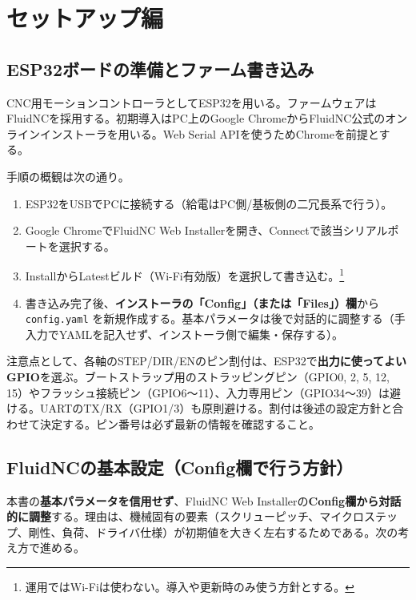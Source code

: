 \documentclass[uplatex,dvipdfmx]{ujarticle}
\begin{document}
\section{セットアップ編}

\subsection{ESP32ボードの準備とファーム書き込み}

CNC用モーションコントローラとしてESP32を用いる。ファームウェアはFluidNCを採用する。初期導入はPC上のGoogle ChromeからFluidNC公式のオンラインインストーラを用いる。Web Serial APIを使うためChromeを前提とする。

手順の概観は次の通り。
\begin{enumerate}
\item ESP32をUSBでPCに接続する（給電はPC側/基板側の二冗長系で行う）。
\item Google ChromeでFluidNC Web Installerを開き、Connectで該当シリアルポートを選択する。
\item InstallからLatestビルド（Wi-Fi有効版）を選択して書き込む。\footnote{運用ではWi-Fiは使わない。導入や更新時のみ使う方針とする。}
\item 書き込み完了後、\textbf{インストーラの「Config」（または「Files」）欄}から \texttt{config.yaml} を新規作成する。基本パラメータは後で対話的に調整する（手入力でYAMLを記入せず、インストーラ側で編集・保存する）。
\end{enumerate}

注意点として、各軸のSTEP/DIR/ENのピン割付は、ESP32で\textbf{出力に使ってよいGPIO}を選ぶ。ブートストラップ用のストラッピングピン（GPIO0, 2, 5, 12, 15）やフラッシュ接続ピン（GPIO6〜11）、入力専用ピン（GPIO34〜39）は避ける。UARTのTX/RX（GPIO1/3）も原則避ける。割付は後述の設定方針と合わせて決定する。ピン番号は必ず最新の情報を確認すること｡



\subsection{FluidNCの基本設定（Config欄で行う方針）}

本書の\textbf{基本パラメータを信用せず}、FluidNC Web Installerの\textbf{Config欄から対話的に調整}する。理由は、機械固有の要素（スクリューピッチ、マイクロステップ、剛性、負荷、ドライバ仕様）が初期値を大きく左右するためである。次の考え方で進める。
\end{document}
